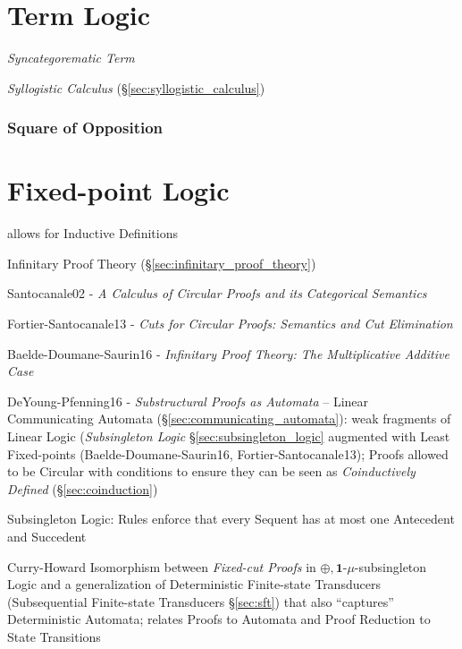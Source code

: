 \section{Term Logic}\label{sec:term_logic}

\emph{Syncategorematic Term}

\emph{Syllogistic Calculus} (\S\ref{sec:syllogistic_calculus})



\subsubsection{Square of Opposition}\label{sec:square_of_opposition}



\section{Fixed-point Logic}\label{sec:fixedpoint_logic}

allows for Inductive Definitions

\fist Infinitary Proof Theory (\S\ref{sec:infinitary_proof_theory})

Santocanale02 - \emph{A Calculus of Circular Proofs and its
  Categorical Semantics}

Fortier-Santocanale13 - \emph{Cuts for Circular Proofs: Semantics and
  Cut Elimination}

Baelde-Doumane-Saurin16 - \emph{Infinitary Proof Theory: The
  Multiplicative Additive Case}

\asterism

DeYoung-Pfenning16 - \emph{Substructural Proofs as Automata} -- Linear
Communicating Automata (\S\ref{sec:communicating_automata}): weak
fragments of Linear Logic (\emph{Subsingleton Logic}
\S\ref{sec:subsingleton_logic} augmented with Least Fixed-points
(Baelde-Doumane-Saurin16, Fortier-Santocanale13); Proofs allowed to be
Circular with conditions to ensure they can be seen as
\emph{Coinductively Defined} (\S\ref{sec:coinduction})

Subsingleton Logic: Rules enforce that every Sequent has at most one
Antecedent and Succedent

Curry-Howard Isomorphism between \emph{Fixed-cut Proofs} in
$\oplus,\mathbf{1}$-$\mu$-subsingleton Logic and a generalization of
Deterministic Finite-state Transducers (Subsequential Finite-state
Transducers \S\ref{sec:sft}) that also ``captures'' Deterministic
Automata; relates Proofs to Automata and Proof Reduction to State
Transitions

